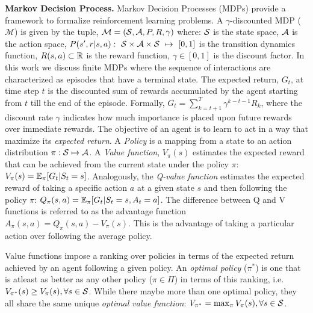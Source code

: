 \textbf{Markov Decision Process.}
Markov Decision Processes (MDPs) provide a framework to formalize reinforcement learning problems.
A $\gamma$-discounted MDP ($\mathcal{M}$) is given by the tuple, $\mathcal{M}=(\mathcal{S}, \mathcal{A}, P, R,
	\gamma)$ where: $\mathcal{S}$ is the state space, $\mathcal{A}$ is the action space,
$P(s',r|s,a):~\mathcal{S}\times\mathcal{A}\times\mathcal{S}~\mapsto~[0,1]$ is the transition dynamics function,
$R(s,a) \subset \mathbb{R}$ is the reward function, $\gamma \in [0,1]$ is the discount factor.
In this work we discuss finite MDPs where the sequence of interactions are characterized as
episodes that have a terminal state.
The expected return, $G_t$, at time step $t$ is the discounted sum of rewards accumulated by the
agent starting from $t$ till the end of the episode.
Formally, $G_t = \sum_{k=t+1}^{T} \gamma^{k-t-1} R_k$, where the discount rate $\gamma$ indicates
how much importance is placed upon future rewards over immediate rewards.
The objective of an agent is to learn to act in a way that maximize its \textit{expected return}.
A \textit{Policy} is a mapping from a state to an action distribution $\pi: \mathcal{S} \mapsto \mathcal{A}$.
A \textit{Value function}, $V_{\pi}(s)$ estimates the expected reward that can be achieved from the
current state under the policy $\pi$: $V_{\pi}(s) = \mathbb{E}_{\pi}[G_t | S_t = s]$.
Analogously, the \textit{Q-value function} estimates the expected reward of taking a specific
action $a$ at a given state $s$ and then following the policy $\pi$: $ Q_{\pi}(s, a) = \mathbb{E}_{\pi}[G_t
		| S_t = s, A_t = a] $.
The difference between Q and V functions is referred to as the advantage function $A_\pi(s,a) =
	Q_\pi(s,a) - V_\pi(s)$.
This is the advantage of taking a particular action over following the average policy.

Value functions impose a ranking over policies in terms of the expected return achieved by an agent
following a given policy.
An \textit{optimal policy} ($\pi^\ast$) is one that is atleast as better as any other policy ($\pi
	\in \Pi$) in terms of this ranking, i.e. $V_{\pi^\ast}(s) \geq V_\pi(s), \forall s \in \mathcal{S}$.
While there maybe more than one optimal policy, they all share the same unique \textit{optimal
	value function}: $V_{\pi^{\ast}} = \max_{\pi} V_\pi(s), \forall s \in \mathcal{S}$.

